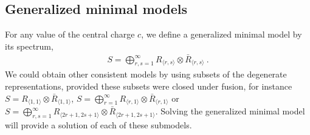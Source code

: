 \documentclass[12pt,a4paper,notitlepage]{report}
\numberwithin{equation}{section}
\theoremstyle{break}
\begin{document}
\subsection{Generalized minimal models}

For any value of the central charge $c$, we define a generalized minimal model by its spectrum,
\begin{align}
 \boxed{S = \bigoplus_{r,s=1}^\infty R_{\langle r,s \rangle}\otimes \bar{R}_{\langle r,s \rangle}}\ .
\end{align}
We could obtain other consistent models by using subsets of the degenerate representations, provided these subsets were closed under fusion, for instance $S=R_{\langle 1,1 \rangle}\otimes \bar{R}_{\langle 1,1 \rangle}$, $S=\bigoplus_{r=1}^\infty R_{\langle r,1 \rangle}\otimes \bar{R}_{\langle r,1 \rangle}$ or $S=\bigoplus_{r,s=1}^{\infty} R_{\langle 2r+1,2s+1 \rangle}\otimes \bar{R}_{\langle 2r+1,2s+1 \rangle}$. Solving the generalized minimal model will provide a solution of each of these submodels. 
\end{document}
